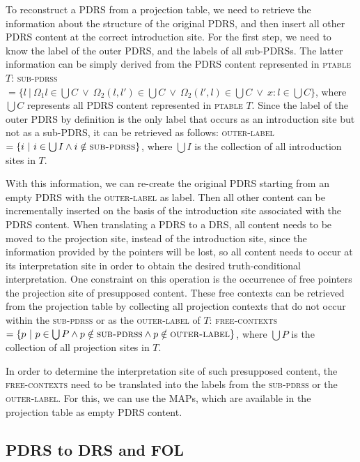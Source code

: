 To reconstruct a PDRS from a projection table, we need to
retrieve the information about the structure of the original PDRS,
and then insert all other PDRS content at the correct introduction site. For
the first step, we need to know the label of the outer PDRS, and the labels
of all sub-PDRSs. The latter information can be simply derived from the PDRS
content represented in \textsc{ptable} $T$: \textsc{sub-pdrss} $=\{l~|~\Omega_1
  l \in \bigcup C ~\vee~ \Omega_2(l,l') \in \bigcup C ~\vee~ \Omega_2(l',l) \in
\bigcup C ~\vee~ x:l \in \bigcup C \}$, where $\bigcup C$ represents all
PDRS content represented in \textsc{ptable} $T$. Since the label of the
outer PDRS by definition is the only label that occurs as an introduction
site but not as a sub-PDRS, it can be retrieved as follows:
\textsc{outer-label} $=\{i~|~i\in\bigcup I \wedge i \notin
\textsc{sub-pdrss}\}$, where $\bigcup I$ is the collection of all
introduction sites in $T$.

With this information, we can re-create the original PDRS starting from an
empty PDRS with the \textsc{outer-label} as label. Then all other content
can be incrementally inserted on the basis of the introduction site
associated with the PDRS content. When translating a PDRS to a DRS, all
content needs to be moved to the projection site, instead of the
introduction site, since the information provided by the pointers will be
lost, so all content needs to occur at its interpretation site in order to
obtain the desired truth-conditional interpretation. One constraint on this
operation is the occurrence of free pointers the projection site of
presupposed content. These free contexts can be retrieved from the
projection table by collecting all projection contexts that do not occur
within the \textsc{sub-pdrss} or as the \textsc{outer-label} of $T$:
\textsc{free-contexts} $=\{p~|~p\in\bigcup P \wedge p \notin
\textsc{sub-pdrss} \wedge p \notin \textsc{outer-label}\}$, where $\bigcup
P$ is the collection of all projection sites in $T$.

In order to determine the interpretation site of such presupposed content,
the \textsc{free-contexts} need to be translated into the labels from the
\textsc{sub-pdrss} or the \textsc{outer-label}. For this, we can use the
MAPs, which are available in the projection table as empty PDRS content.

\subsection{PDRS to DRS and FOL}

